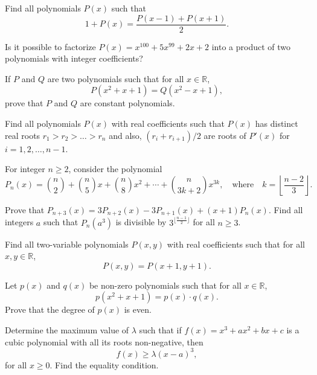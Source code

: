 \begin{question}
    Find all polynomials $P(x)$ such that
    \[1+ P(x) = \frac{P(x-1)+P(x+1)}{2}.\]
\end{question}


\begin{question}
    Is it possible to factorize $P(x)=x^{100}+5x^{99}+2x+2$ into a product of two polynomials with integer coefficients?
\end{question}


\begin{question}
    If $P$ and $Q$ are two polynomials such that for all $x\in\mathbb R$, \[P(x^2+x+1)=Q(x^2-x+1),\] prove that $P$ and $Q$ are constant polynomials.
\end{question}

\begin{question}
    Find all polynomials $P(x)$ with real coefficients such that $P(x)$ has distinct real roots $r_1>r_2>\dots > r_n$ and also, $(r_i+r_{i+1})/2$ are roots of $P'(x)$ for $i=1,2,\dots,n-1$.
\end{question}


\begin{question}[name={1997 Bulgaria}]
    For integer $n \geq 2$, consider the polynomial
    \[P_n(x) = \binom {n}{2}+\binom {n}{5}x+\binom {n}{8}x^2 + \cdots + \binom {n}{3k+2}x^{3k}, \quad \text{where} \quad k = \left\lfloor \frac{n-2}{3} \right \rfloor.\]
    \begin{tasks}
        \task Prove that $P_{n+3}(x)=3P_{n+2}(x)-3P_{n+1}(x)+(x+1)P_n(x)$.
        \task Find all integers $a$ such that $P_n(a^3)$ is divisible by $3^{ \lfloor \frac{n-1}{2} \rfloor}$ for all $n \ge 3$.
    \end{tasks}
\end{question}

\begin{question}
    Find all two-variable polynomials $P(x,y)$ with real coefficients such that for all $x,y\in\mathbb R$, \[P(x,y)=P(x+1,y+1).\]
\end{question}

\begin{question}
    Let $p(x)$ and $q(x)$ be non-zero polynomials such that for all $x\in \mathbb R$, \[p(x^2+x+1)=p(x)\cdot q(x).\] Prove that the degree of $p(x)$ is even.
\end{question}

\begin{question}[name={1999 China}]
    Determine the maximum value of $\lambda$ such that if $f(x) = x^3 +ax^2 +bx+c$ is a cubic polynomial with all its roots non-negative, then
    \[f(x)\geq\lambda(x -a)^3,\] for all $x\geq0$. Find the equality condition.
\end{question}

